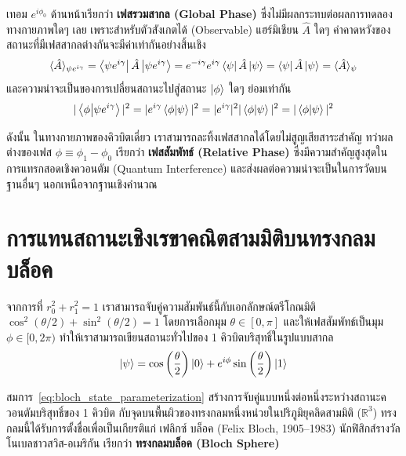 เทอม $e^{i\phi_0}$ ด้านหน้าเรียกว่า \textbf{เฟสรวมสากล (Global Phase)} ซึ่งไม่มีผลกระทบต่อผลการทดลองทางกายภาพใดๆ เลย เพราะสำหรับตัวสังเกตได้ (Observable) แฮร์มิเชียน $\hat{A}$ ใดๆ ค่าคาดหวังของสถานะที่มีเฟสสากลต่างกันจะมีค่าเท่ากันอย่างสิ้นเชิง
\begin{equation}
\langle \hat{A} \rangle_{\psi e^{i\gamma}} = \bra{\psi e^{i\gamma}} \hat{A} \ket{\psi e^{i\gamma}} = e^{-i\gamma} e^{i\gamma} \bra{\psi}\hat{A}\ket{\psi} = \bra{\psi}\hat{A}\ket{\psi} = \langle \hat{A} \rangle_\psi
\end{equation}
และความน่าจะเป็นของการเปลี่ยนสถานะไปสู่สถานะ $\ket{\phi}$ ใดๆ ย่อมเท่ากัน
\begin{equation}
|\braket{\phi}{\psi e^{i\gamma}}|^2 = |e^{i\gamma} \braket{\phi}{\psi}|^2 = |e^{i\gamma}|^2 |\braket{\phi}{\psi}|^2 = |\braket{\phi}{\psi}|^2
\end{equation}

ดังนั้น ในทางกายภาพของคิวบิตเดี่ยว เราสามารถละทิ้งเฟสสากลได้โดยไม่สูญเสียสาระสำคัญ ทว่าผลต่างของเฟส $\phi \equiv \phi_1 - \phi_0$ เรียกว่า \textbf{เฟสสัมพัทธ์ (Relative Phase)} ซึ่งมีความสำคัญสูงสุดในการแทรกสอดเชิงควอนตัม (Quantum Interference) และส่งผลต่อความน่าจะเป็นในการวัดบนฐานอื่นๆ นอกเหนือจากฐานเชิงคำนวณ

\section{การแทนสถานะเชิงเรขาคณิตสามมิติบนทรงกลมบล็อค}

จากการที่ $r_0^2 + r_1^2 = 1$ เราสามารถจับคู่ความสัมพันธ์นี้กับเอกลักษณ์ตรีโกณมิติ $\cos^2(\theta/2) + \sin^2(\theta/2) = 1$ โดยการเลือกมุม $\theta \in [0, \pi]$ และให้เฟสสัมพัทธ์เป็นมุม $\phi \in [0, 2\pi)$ ทำให้เราสามารถเขียนสถานะทั่วไปของ 1 คิวบิตบริสุทธิ์ในรูปแบบสากล
\begin{equation}
\ket{\psi} = \cos\left(\frac{\theta}{2}\right) \ket{0} + e^{i\phi} \sin\left(\frac{\theta}{2}\right) \ket{1}
\label{eq:bloch_state_parameterization}
\end{equation}

สมการ~\eqref{eq:bloch_state_parameterization} สร้างการจับคู่แบบหนึ่งต่อหนึ่งระหว่างสถานะควอนตัมบริสุทธิ์ของ 1 คิวบิต กับจุดบนพื้นผิวของทรงกลมหนึ่งหน่วยในปริภูมิยุคลิดสามมิติ ($\mathbb{R}^3$) ทรงกลมนี้ได้รับการตั้งชื่อเพื่อเป็นเกียรติแก่ เฟลิกซ์ บล็อค (Felix Bloch, 1905--1983) นักฟิสิกส์รางวัลโนเบลชาวสวิส-อเมริกัน เรียกว่า \textbf{ทรงกลมบล็อค (Bloch Sphere)}


